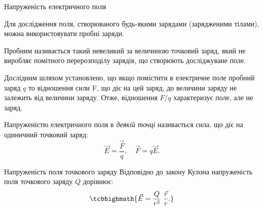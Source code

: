 \documentclass{beamer}
\begin{document}



\begin{frame}{Напруженість електричного поля}{}
	\begin{block}{}\justifying
		Для дослідження поля, створюваного будь-якими зарядами
		(зарядженими тілами), можна використовувати \alert{пробні заряди}.

		\bigskip

		\alert{Пробним} називається такий невеликий за величиною точковий
		заряд, який не виробляє помітного перерозподілу зарядів,
		що створюють досліджуване поле.
	\end{block}

	\begin{block}{}\justifying
		Дослідним шляхом установлено, що якщо помістити в електричне
		поле пробний заряд $q$ то відношення сили F, що діє на цей
		заряд, до величини заряду не залежить від величини заряду. Отже,
		відношення $F/q$ характеризує поле, але не заряд.
	\end{block}

	\begin{block}{}
		\alert{Напруженістю електричного поля} в \emph{деякій точці}
		називається сила, що діє на одиничний точковий заряд:
		\begin{equation*}
			\vec{E} = \frac{\vec{F}}{q}, \quad \vec{F} = q\vec{E}.
		\end{equation*}
	\end{block}
\end{frame}


\begin{frame}{Напруженість поля точкового заряду}{}
	Відповідно до закону Кулона напруженість поля точкового
	заряду $Q$ дорівнює:
	\begin{equation*}
		\tcbhighmath{
			\vec{E} = \frac{Q}{r^2}\ \frac{\vec{r}}{r}.
		}
	\end{equation*}
	
\end{frame}
\end{document}
